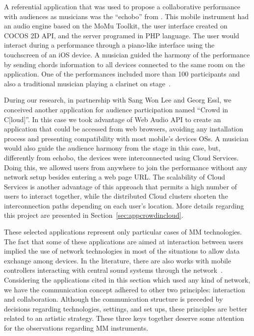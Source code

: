 A referential application that was used to propose a collaborative performance with audiences as musicians was the ``echobo'' from \citeauthor{Lee2013echobo}.
This mobile instrument had an audio engine based on the MoMu Toolkit, the user interface created on COCOS 2D API, and the server programed in PHP language. 
The user would interact during a performance through a piano-like interface using the touchscreen of an iOS device.
A musician guided the harmony of the performance by sending chords information to all devices connected to the same room on the application.
One of the performances included more than 100 participants and also a traditional musician playing a clarinet on stage~\citep{Lee2013echobo}.

During our research, in partnership with Sang Won Lee and Georg Essl, we conceived another application for audience participation named ``Crowd in C[loud]''.
In this case we took advantage of Web Audio API to create an application that could be accessed from web browsers, avoiding any installation process and presenting compatibility with most mobile's devices OSs.
A musician would also guide the audience harmony from the stage in this case, but, differently from echobo, the devices were interconnected using Cloud Services.
Doing this, we allowed users from anywhere to join the performance without any network setup besides entering a web page URL.
The scalability of Cloud Services is another advantage of this approach that permits a high number of users to interact together, while the distributed Cloud clusters shorten the interconnection paths depending on each user's location.
More details regarding this project are presented in Section~\ref{sec:appcrowdincloud}.

These selected applications represent only particular cases of MM technologies.
The fact that some of these applications are aimed at interaction between users implied the use of network technologies in most of the situations to allow data exchange among devices.
In the literature, there are also works with mobile controllers interacting with central sound systems through the network~\citep{Weitzner2012massmobile,Allison2013nexus,Hindle2013swarmed}.
Considering the applications cited in this section which used any kind of network, we have the communication concept adhered to other two principles: interaction and collaboration.
Although the communication structure is preceded by decisions regarding technologies, settings, and set ups, these principles are better related to an artistic strategy.
These three keys together deserve some attention for the observations regarding MM instruments.






